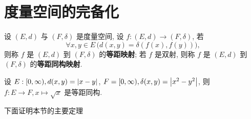 \section{度量空间的完备化}
	\begin{Definition}[等距同构]\label{def:等距同构}
		 设 $ (E, d) $ 与 $ (F, \delta) $ 是度量空间, 设 $ f:(E, d)\to(F, \delta) $, 若
		 \[
			 \forall x, y\in E\,\big(d(x, y)=\delta(f(x), f(y))\big),
		 \]
		 则称 $ f $ 是 $ (E, d) $ 到 $ (F, \delta) $ 的\textbf{等距映射}; 若 $ f $ 是双射, 则称 $ f $ 是 $ (E, d) $ 到 $ (F, \delta) $ 的\textbf{等距同构映射}.
	\end{Definition}

	\begin{Example}
		设 $ E:[0,\infty), d(x, y)=\left| x-y \right|  $, $ F=[0, \infty), \delta(x, y)=\left| x^{2}-y^{2} \right|  $, 则 $ f:E\to F, x\mapsto \sqrt{x} $ 是等距同构.
	\end{Example}

	下面证明本节的主要定理

